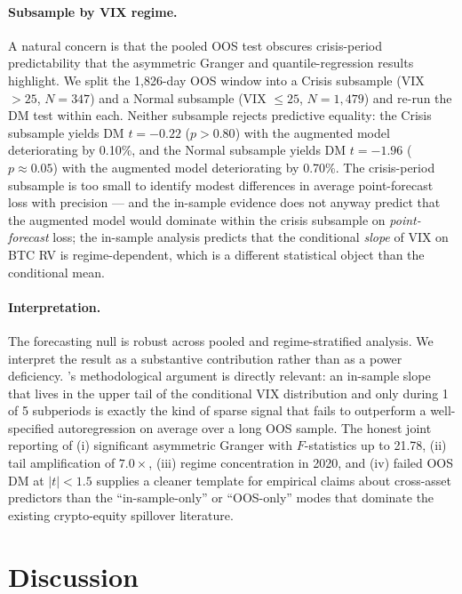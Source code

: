 \documentclass[11pt,a4paper]{article}
\begin{document}
\paragraph{Subsample by VIX regime.} A natural concern is that the pooled OOS test obscures crisis-period predictability that the asymmetric Granger and quantile-regression results highlight. We split the 1{,}826-day OOS window into a Crisis subsample (VIX $> 25$, $N = 347$) and a Normal subsample (VIX $\le 25$, $N = 1{,}479$) and re-run the DM test within each. Neither subsample rejects predictive equality: the Crisis subsample yields DM $t = -0.22$ ($p > 0.80$) with the augmented model deteriorating by 0.10\%, and the Normal subsample yields DM $t = -1.96$ ($p \approx 0.05$) with the augmented model deteriorating by 0.70\%.%
The crisis-period subsample is too small to identify modest differences in average point-forecast loss with precision --- and the in-sample evidence does not anyway predict that the augmented model would dominate within the crisis subsample on \emph{point-forecast} loss; the in-sample analysis predicts that the conditional \emph{slope} of VIX on BTC RV is regime-dependent, which is a different statistical object than the conditional mean.

\paragraph{Interpretation.} The forecasting null is robust across pooled and regime-stratified analysis. We interpret the result as a substantive contribution rather than as a power deficiency. \citet{conrad2020}'s methodological argument is directly relevant: an in-sample slope that lives in the upper tail of the conditional VIX distribution and only during 1 of 5 subperiods is exactly the kind of sparse signal that fails to outperform a well-specified autoregression on average over a long OOS sample. The honest joint reporting of (i) significant asymmetric Granger with $F$-statistics up to 21.78, (ii) tail amplification of $7.0\times$, (iii) regime concentration in 2020, and (iv) failed OOS DM at $|t| < 1.5$ supplies a cleaner template for empirical claims about cross-asset predictors than the ``in-sample-only'' or ``OOS-only'' modes that dominate the existing crypto-equity spillover literature.

\section{Discussion}
\label{sec:discussion}
\end{document}
